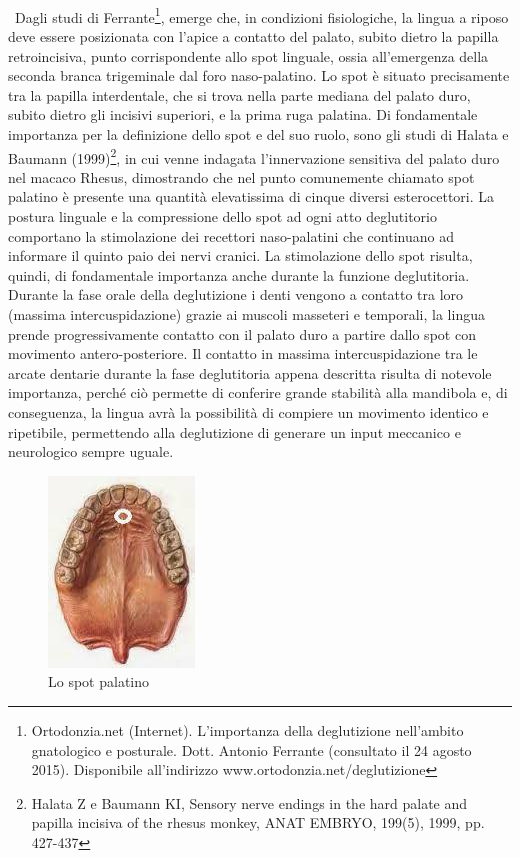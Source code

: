 \\\ \\\ \\\
Dagli studi di Ferrante\footnote{Ortodonzia.net (Internet). L'importanza della deglutizione nell'ambito gnatologico e posturale. Dott. Antonio
Ferrante (consultato il 24 agosto 2015). Disponibile all'indirizzo www.ortodonzia.net/deglutizione}, emerge che, in condizioni fisiologiche, la lingua a riposo deve essere posizionata con l'apice a contatto del palato, subito dietro la papilla retroincisiva, punto corrispondente allo spot linguale, ossia all'emergenza della seconda branca trigeminale dal foro naso-palatino.  Lo spot è situato precisamente tra la papilla interdentale, che si trova nella parte mediana del palato duro, subito dietro gli incisivi superiori, e la prima ruga palatina. Di fondamentale importanza per la definizione dello spot e del suo ruolo, sono gli studi di Halata e Baumann (1999)\footnote{Halata Z e Baumann KI, Sensory nerve endings in the hard palate and papilla incisiva of the rhesus monkey, ANAT
EMBRYO, 199(5), 1999, pp. 427-437}, in cui venne indagata l'innervazione sensitiva del palato duro nel macaco Rhesus, dimostrando che nel punto comunemente chiamato spot palatino è presente una quantità elevatissima di cinque diversi esterocettori. La postura linguale e la compressione dello spot ad ogni atto deglutitorio comportano la stimolazione dei recettori naso-palatini che continuano ad informare il quinto paio dei nervi cranici. La stimolazione dello spot risulta, quindi, di fondamentale importanza anche durante la funzione deglutitoria. Durante la fase orale della deglutizione i denti vengono a contatto tra loro (massima intercuspidazione) grazie ai muscoli masseteri e temporali, la lingua prende progressivamente contatto con il palato duro a partire dallo spot con movimento antero-posteriore. Il contatto in massima intercuspidazione tra le arcate dentarie durante la fase deglutitoria appena descritta risulta di notevole importanza, perché ciò permette di conferire grande stabilità alla mandibola e, di conseguenza, la lingua avrà la possibilità di compiere un movimento identico e ripetibile, permettendo alla deglutizione di generare un input meccanico e neurologico sempre uguale.

 \begin{figure}[h!]
	\centering
	\includegraphics[scale=0.4]{source/immagini/spot_palatino.jpg}
	\caption[figure]{Lo spot palatino}
	\label{fig:issuexample}
\end{figure}

